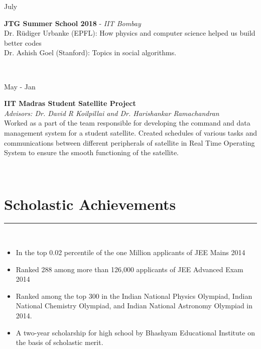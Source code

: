 \documentclass[10pt]{article}
\newcommand\vtick{\textquotesingle}
\begin{document}
\noindent
\begin{minipage}[t]{.2\textwidth}
July\vtick18 
\end{minipage}
\begin{minipage}[t]{0.8\textwidth}
{\bf JTG Summer School 2018} - {\it IIT Bombay} \\
Dr. Rüdiger Urbanke (EPFL): How physics and computer science helped us build better codes \\
Dr. Ashish Goel (Stanford): Topics in social algorithms.
\end{minipage} \\

\noindent
\begin{minipage}[t]{.2\textwidth}
May\vtick16 - Jan\vtick17
\end{minipage}
\begin{minipage}[t]{0.8\textwidth}
{\bf IIT Madras Student Satellite Project} \\
{\it Advisors: Dr. David R Koilpillai and Dr. Harishankar Ramachandran}\\
Worked as a part of the team responsible for developing the command and data management system for a student satellite. Created schedules of various tasks and communications between different peripherals of satellite in Real Time Operating System to ensure the smooth functioning of the satellite.
\end{minipage} \\

\section*{\color{black} Scholastic Achievements}
\noindent\textcolor{black}{\rule{\textwidth}{1pt}} \vspace{-1cm}\\
\begin{itemize}
    \setlength\itemsep{-.1em}
    \item In the top 0.02 percentile of the one Million applicants of JEE Mains 2014
    \item Ranked 288 among more than 126,000 applicants of JEE Advanced Exam 2014
    \item Ranked among the top 300 in the Indian National Physics Olympiad, Indian National Chemistry Olympiad, and Indian National Astronomy Olympiad in 2014.
    \item A two-year scholarship for high school by Bhashyam Educational Institute on the basis of scholastic merit.
\end{itemize}
\end{document}
